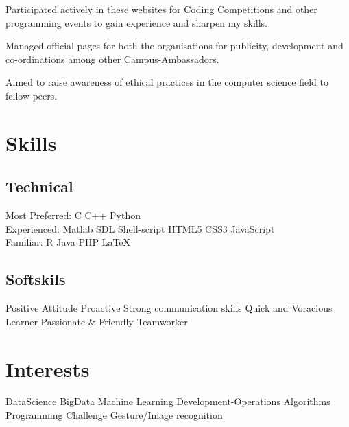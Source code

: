 \documentclass[]{sagar_resume}
\begin{document}
\begin{minipage}[t]{0.66\textwidth}
\begin{tightemize}
\item Participated actively in these websites for Coding Competitions and other programming events to gain experience and sharpen my skills.
\item Managed official pages for both the organisations for publicity, development and co-ordinations among other Campus-Ambassadors.
\end{tightemize}
\sectionsep

\begin{tightemize}
\item Aimed to raise awareness of ethical practices in the computer science field to fellow peers.
\end{tightemize}
\sectionsep

\section{Skills}
\subsection{Technical}
Most Preferred: C \textbullet{} C++ \textbullet{} Python\\
Experienced: Matlab \textbullet{} SDL\textbullet{} Shell-script \textbullet{} HTML5 \textbullet{} CSS3 \textbullet{} JavaScript  \\
Familiar: R \textbullet{} Java \textbullet{} PHP \textbullet{} \LaTeX\\
\sectionsep
\subsection{Softskils}
Positive Attitude
\textbullet{}Proactive
\textbullet{}Strong communication skills
\textbullet{}Quick and Voracious Learner
\textbullet{}Passionate \& Friendly
\textbullet{}Teamworker
\sectionsep

\section{Interests}
DataScience
\textbullet{}BigData
\textbullet{}Machine Learning
\textbullet{}Development-Operations
\textbullet{}Algorithms
\textbullet{}Programming Challenge
\textbullet{}Gesture/Image recognition



\end{minipage}
\end{document}
